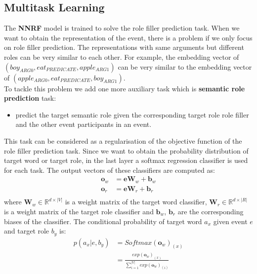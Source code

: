 \documentclass[a4paper]{article}
\begin{document}
\subsection{Multitask Learning}
The \textbf{NNRF} model is trained to solve the role filler prediction task. When we want to obtain the representation of the event, there is a problem if we only focus on role filler prediction. The representations with same arguments but different roles can be very similar to each other. For example, the embedding vector of $(boy_{ARG0}, eat_{PREDICATE}, apple_{ARG1})$ can be very similar to the embedding vector of  $(apple_{ARG0}, eat_{PREDICATE}, boy_{ARG1})$. \\
To tackle this problem we add one more auxiliary task which is  \textbf{semantic role prediction} task:
\begin{itemize}
  \item  predict the target semantic role given the corresponding target role role filler and the other event participants  in an event.
\end{itemize}
This task can be considered as a regularisation of the objective function of the role filler prediction task.
\noindent
Since we want to obtain the probability distribution of target word or target role, in the last layer a softmax regression classifier is used for each task. The output vectors of these classifiers are computed as:
\begin{equation} \label{eq:output}
\begin{aligned}
    \mathbf{o}_w
        &= \mathbf{e}\mathbf{W}_w + \mathbf{b}_w \\
    \mathbf{o}_r
        &= \mathbf{e}\mathbf{W}_r + \mathbf{b}_r \\
\end{aligned}
\end{equation}
where $\mathbf{W}_w \in \mathbb{R}^{d \times |V|}$ is a weight matrix of the target word classifier,  $\mathbf{W}_r \in \mathbb{R}^{d \times |R|}$ is a weight matrix of the target role classifier and $\mathbf{b}_w$, $\mathbf{b}_r$ are the corresponding biases of the classifier. The conditional probability of target word $a_x$ given event $e$ and target role $b_y$ is:
\begin{equation} \label{eq:softmax_w}
\begin{aligned}
    p(a_x | e, b_y)
        &= Softmax(\mathbf{o}_w)_{(x)} \\
        &= \frac{
        exp(\mathbf{o}_w)_{(x)}
        }{
        \sum_{i=1}^{|V|} exp(\mathbf{o}_w)_{(i)} }   \\
\end{aligned}
\end{equation}
\end{document}
